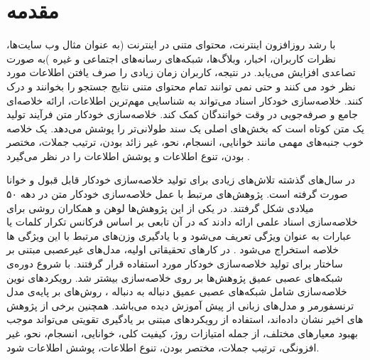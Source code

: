 \chapter{مقدمه}
با رشد روزافزون اینترنت، محتوای متنی در اینترنت (به عنوان مثال وب سایت‌ها، نظرات کاربران، اخبار، وبلاگ‌ها، شبکه‌های رسانه‌های اجتماعی و غیره )به صورت تصاعدی افزایش می‌یابد. در نتیجه، کاربران زمان زیادی را صرف یافتن اطلاعات مورد نظر خود می کنند و حتی نمی توانند تمام محتوای متنی نتایج جستجو را بخوانند و درک کنند. خلاصه‌سازی خودکار اسناد می‌تواند به شناسایی مهم‌ترین اطلاعات، ارائه خلاصه‌ای جامع و صرفه‌جویی در وقت خوانندگان کمک کند. خلاصه‌سازی خودکار متن فرآیند تولید یک متن کوتاه است که بخش‌های اصلی یک سند طولانی‌تر را پوشش می‌دهد. یک خلاصه خوب جنبه‌های مهمی مانند خوانایی، انسجام، نحو، غیر زائد بودن، ترتیب جملات، مختصر بودن، تنوع اطلاعات و پوشش اطلاعات را در نظر می‌گیرد
\cite{ELKASSAS2021113679}
.


در سال‌های گذشته تلاش‌های زیادی برای تولید خلاصه‌سازی خودکار قابل قبول و خوانا صورت گرفته است. 
پژوهش‌های مرتبط با عمل خلاصه‌سازی خودکار متن در دهه ۵۰ میلادی شکل گرفتند. در یکی از این پژوهش‌ها لوهن و همکاران روشی برای خلاصه‌سازی اسناد علمی ‌ارائه دادند که در آن تابعی بر اساس فرکانس تکرار کلمات یا عبارات به عنوان ویژگی تعریف ‌می‌شود و با یادگیری وزن‌های مرتبط با این ویژگی ها خلاصه استخراج می‌شود
\cite{luhn1958automatic}.
در کارهای تحقیقاتی اولیه، مدل‌های غیرعصبی  مبتنی بر ساختار برای تولید خلاصه‌سازی خودکار مورد استفاده قرار گرفتند. با شروع دوره‌ی شبکه‌های عصبی عمیق پژوهش‌ها بر روی خلاصه‌سازی بیشتر شد. رویکرد‌های نوین خلاصه‌سازی شامل شبکه‌های عصبی عمیق دنباله به دنباله
، روش‌های بر پایه‌ی مدل ترنسفورمر
و مدل‌های زبانی از پیش آموزش دیده
می‌باشد. 
همچنین برخی از پژوهش های اخیر نشان داده‌اند، استفاده از رویکردهای مبتنی بر یادگیری تقویتی
می‌تواند موجب بهبود معیارهای مختلف، از جمله امتیازات روژ، کیفیت کلی، خوانایی، انسجام، نحو، غیر افزونگی، ترتیب جملات، مختصر بودن، تنوع اطلاعات، پوشش اطلاعات شود. 


